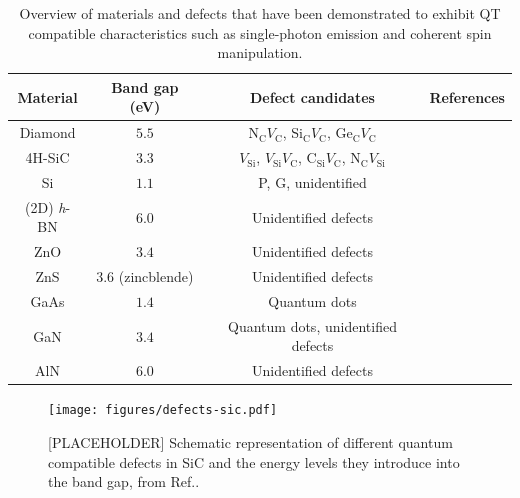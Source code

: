 \documentclass[superscriptaddress,unsortedaddress,
 amsmath,amssymb,
 aps,
]{revtex4-2}
\begin{document}
\begin{table}[h]
    \centering
    \caption{Overview of materials and defects that have been demonstrated to exhibit QT compatible characteristics such as single-photon emission and coherent spin manipulation.}
    \begin{tabular}{c|c|c|c}
    Material & Band gap (eV) & Defect candidates & References \\
    \hline
    Diamond  & $5.5$  & N$_\mathrm{C}V_\mathrm{C}$, Si$_\mathrm{C}V_\mathrm{C}$, Ge$_\mathrm{C}V_\mathrm{C}$ & \cite{Balasubramanian_2009,Rogers_2014,Bhaskar_2018} \\ 4H-SiC & $3.3$ & $V_\mathrm{Si}$, $V_\mathrm{Si}V_\mathrm{C}$, C$_\mathrm{Si}V_\mathrm{C}$, N$_\mathrm{C}V_\mathrm{Si}$ & \cite{Widmann2014,Christle_2015,Castelletto_2014,Zargaleh_2018} \\ 
    Si & $1.1$ & P, G, unidentified & \cite{Muhonen_2014,Durand_2020,Redjem2020} \\ 
    (2D) \textit{h}-BN & $6.0$ & Unidentified defects & \cite{Tran_2016,Tran_2016b,Hayee_2020} \\ 
    ZnO & $3.4$ & Unidentified defects & \cite{Morfa2012} \\ 
    ZnS & $3.6$ (zincblende) & Unidentified defects & \cite{Stewart2019} \\ 
    GaAs & $1.4$ & Quantum dots & \cite{Bluhm2010} \\ 
    GaN & $3.4$ & Quantum dots, unidentified defects & \cite{Roux2017,Berhane2018} \\
    AlN & $6.0$ & Unidentified defects & \cite{Xue2020}\\
    \end{tabular}
    \label{tab:qt-materials}
\end{table}


\begin{figure}[t]
    \centering
    \texttt{[image: figures/defects-sic.pdf]}
    \caption{[PLACEHOLDER] Schematic representation of different quantum compatible defects in SiC and the energy levels they introduce into the band gap, from Ref.\cite{Bathen2021}.} 
    \label{fig:defects-sic}
\end{figure}
\end{document}
